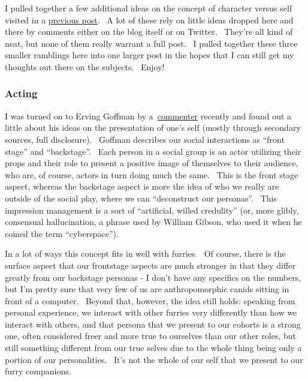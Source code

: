 I pulled together a few additional ideas on the concept of character
versus self visited in a
\href{http://adjectivespecies.com/2011/11/23/character-versus-self/}{previous
post}. ~A lot of these rely on little ideas dropped here and there by
comments either on the blog itself or on Twitter. ~They're all kind of
neat, but none of them really warrant a full post. ~I pulled together
these three smaller ramblings here into one larger post in the hopes
that I can still get my thoughts out there on the subjects. ~Enjoy!

\subsubsection{Acting}\label{acting}

I was turned on to Erving Goffman by
a~\href{http://adjectivespecies.com/2011/11/16/boys-girls-and-the-in-betweens/}{commenter}
recently and found out a little about his ideas on the presentation of
one's self (mostly through secondary sources, full disclosure). ~Goffman
describes our social interactions as ``front stage'' and ``backstage''.
~Each person in a social group is an actor utilizing their props and
their role to present a positive image of themselves to their audience,
who are, of course, actors in turn doing much the same. ~This is the
front stage aspect, whereas the backstage aspect is more the idea of who
we really are outside of the social play, where we can ``deconstruct our
personas''. ~This impression management is a sort of ``artificial,
willed credulity'' (or, more glibly, consensual hallucination, a phrase
used by William Gibson, who used it when he coined the term
``cyberspace'').

In a lot of ways this concept fits in well with furries. ~Of course,
there is the surface aspect that our frontstage aspects are much
stronger in that they differ greatly from our backstage personas - I
don't have any specifics on the numbers, but I'm pretty sure that very
few of us are anthropomorphic canids sitting in front of a computer.
~Beyond that, however, the idea still holds: speaking from personal
experience, we interact with other furries very differently than how we
interact with others, and that persona that we present to our cohorts is
a strong one, often considered freer and more true to ourselves than our
other roles, but still something different from our true selves due to
the whole thing being only a portion of our personalities. ~It's not the
whole of our self that we present to our furry companions.

